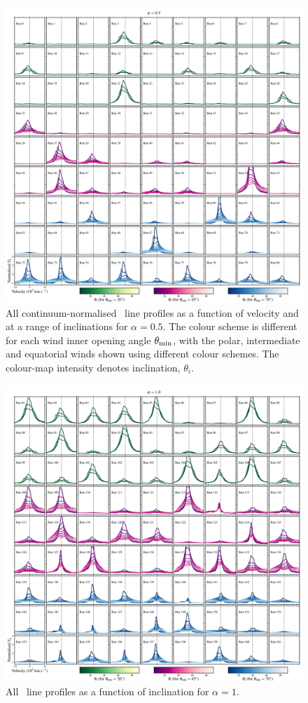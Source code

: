 \documentclass[fleqn,usenatbib,onecolumn]{mnras}
\newcommand{\civ}{\ion{C}{iv}}
\begin{document}
\begin{figure}
    \centering
    \includegraphics[width=\linewidth]{supplement/allprofiles_alpha0.5.png}
    \caption{All continuum-normalised \civ\ line profiles as a function of velocity and at a range of inclinations for $\alpha=0.5$. The colour scheme is different for each wind inner opening angle $\theta_{\rm min}$, with the polar, intermediate and equatorial winds shown using different colour schemes. The colour-map intensity denotes inclination, $\theta_i$.}
    \label{fig:all_line_profiles1}
\end{figure}
\begin{figure}
    \centering
    \includegraphics[width=\linewidth]{supplement/allprofiles_alpha1.png}
    \caption{All \civ\ line profiles as a function of inclination for $\alpha=1$.}
    \label{fig:all_line_profiles2}
\end{figure}
\end{document}
